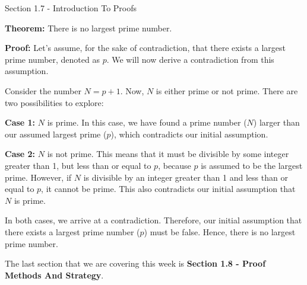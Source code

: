 \begin{notes}{Section 1.7 - Introduction To Proofs}
    \begin{highlight}
        \textbf{Theorem:} There is no largest prime number. \vspace*{1em}
    
    
        \textbf{Proof:} Let's assume, for the sake of contradiction, that there exists a largest prime number, denoted as \(p\). We will now derive a contradiction from this assumption.
    
        Consider the number \(N = p + 1\). Now, \(N\) is either prime or not prime. There are two possibilities to explore:
    
        \textbf{Case 1:} \(N\) is prime. In this case, we have found a prime number (\(N\)) larger than our assumed largest prime (\(p\)), which contradicts our initial assumption.
    
        \textbf{Case 2:} \(N\) is not prime. This means that it must be divisible by some integer greater than 1, but less than or equal to \(p\), because \(p\) is assumed to be the largest prime. 
        However, if \(N\) is divisible by an integer greater than 1 and less than or equal to \(p\), it cannot be prime. This also contradicts our initial assumption that \(N\) is prime.
    
    
        In both cases, we arrive at a contradiction. Therefore, our initial assumption that there exists a largest prime number (\(p\)) must be false. Hence, there is no largest prime number.
    \end{highlight}    
\end{notes}

The last section that we are covering this week is \textbf{Section 1.8 - Proof Methods And Strategy}.


